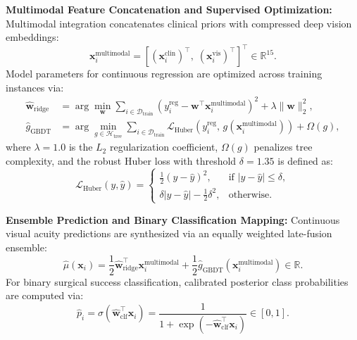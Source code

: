 \documentclass[preprint,12pt]{elsarticle}
\begin{document}
\noindent\textbf{Multimodal Feature Concatenation and Supervised Optimization:} Multimodal integration concatenates clinical priors with compressed deep vision embeddings:
\begin{equation}
\mathbf{x}_i^{\text{multimodal}} = \left[ (\mathbf{x}_i^{\text{clin}})^{\top},\; (\mathbf{x}_i^{\text{vis}})^{\top} \right]^{\top} \in \mathbb{R}^{15}.
\end{equation}
Model parameters for continuous regression are optimized across training instances via:
\begin{align}
\hat{\mathbf{w}}_{\text{ridge}} &= \arg\min_{\mathbf{w}} \sum_{i \in \mathcal{D}_{\text{train}}} \left( y_i^{\text{reg}} - \mathbf{w}^{\top}\mathbf{x}_i^{\text{multimodal}} \right)^2 + \lambda \|\mathbf{w}\|_2^2, \\
\hat{g}_{\text{GBDT}} &= \arg\min_{g \in \mathcal{H}_{\text{tree}}} \sum_{i \in \mathcal{D}_{\text{train}}} \mathcal{L}_{\text{Huber}}\left( y_i^{\text{reg}},\, g(\mathbf{x}_i^{\text{multimodal}}) \right) + \Omega(g),
\end{align}
where $\lambda = 1.0$ is the $L_2$ regularization coefficient, $\Omega(g)$ penalizes tree complexity, and the robust Huber loss with threshold $\delta = 1.35$ is defined as:
\begin{equation}
\mathcal{L}_{\text{Huber}}(y, \hat{y}) = \begin{cases} 
\frac{1}{2}(y - \hat{y})^2, & \text{if } |y - \hat{y}| \le \delta, \\
\delta |y - \hat{y}| - \frac{1}{2}\delta^2, & \text{otherwise}.
\end{cases}
\end{equation}

\noindent\textbf{Ensemble Prediction and Binary Classification Mapping:} Continuous visual acuity predictions are synthesized via an equally weighted late-fusion ensemble:
\begin{equation}
\hat{\mu}(\mathbf{x}_i) = \frac{1}{2}\hat{\mathbf{w}}_{\text{ridge}}^{\top}\mathbf{x}_i^{\text{multimodal}} + \frac{1}{2}\hat{g}_{\text{GBDT}}(\mathbf{x}_i^{\text{multimodal}}) \in \mathbb{R}.
\end{equation}
For binary surgical success classification, calibrated posterior class probabilities are computed via:
\begin{equation}
\hat{p}_i = \sigma\left( \hat{\mathbf{w}}_{\text{clf}}^{\top}\mathbf{x}_i \right) = \frac{1}{1 + \exp\left(-\hat{\mathbf{w}}_{\text{clf}}^{\top}\mathbf{x}_i\right)} \in [0, 1].
\end{equation}
\end{document}
